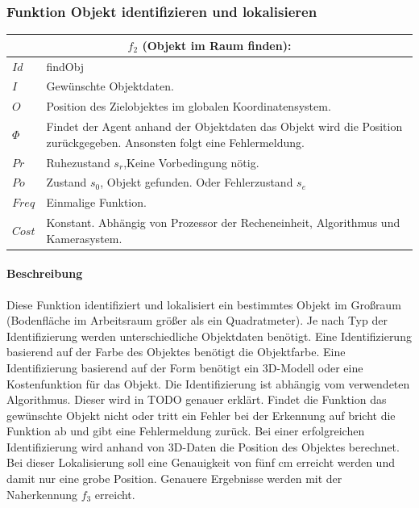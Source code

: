 \subsubsection{Funktion Objekt identifizieren und lokalisieren}
\label{sec:funraum}

\begin{tabular}{|p{3cm}|p{10cm}|}
	\multicolumn{2}{c}{$f_2$ (Objekt im Raum finden):}\\
	\hline  $Id$ & findObj\\ 
	\hline  $I$ & Gewünschte Objektdaten. \\ 
	\hline  $O$ & Position des Zielobjektes im globalen Koordinatensystem. \\ 
	\hline  $\Phi$ & Findet der Agent anhand der Objektdaten das Objekt wird die Position zurückgegeben. Ansonsten folgt eine Fehlermeldung.\\ 
	\hline $Pr$ & Ruhezustand $s_r$,Keine Vorbedingung nötig. \\ 
	\hline $Po$ & Zustand $s_0$, Objekt gefunden. Oder Fehlerzustand $s_e$\\ 
	\hline $Freq$ & Einmalige Funktion.\\ 
	\hline $Cost$ & Konstant. Abhängig von Prozessor der Recheneinheit, Algorithmus und Kamerasystem. \\
	\hline
\end{tabular} 

\paragraph{Beschreibung}
Diese Funktion identifiziert und lokalisiert ein bestimmtes Objekt im Großraum (Bodenfläche im Arbeitsraum größer als ein Quadratmeter). Je nach Typ der Identifizierung werden unterschiedliche Objektdaten benötigt. Eine Identifizierung basierend auf der Farbe des Objektes benötigt die Objektfarbe. Eine Identifizierung basierend auf der Form benötigt ein 3D-Modell oder eine Kostenfunktion für das Objekt. Die Identifizierung ist abhängig vom verwendeten Algorithmus. Dieser wird in TODO genauer erklärt. Findet die Funktion das gewünschte Objekt nicht oder tritt ein Fehler bei der Erkennung auf bricht die Funktion ab und gibt eine Fehlermeldung zurück. Bei einer erfolgreichen Identifizierung wird anhand von 3D-Daten die Position des Objektes berechnet. Bei dieser Lokalisierung soll eine Genauigkeit von fünf cm erreicht werden und damit nur eine grobe Position. Genauere Ergebnisse werden mit der Naherkennung $f_3$ erreicht. 

